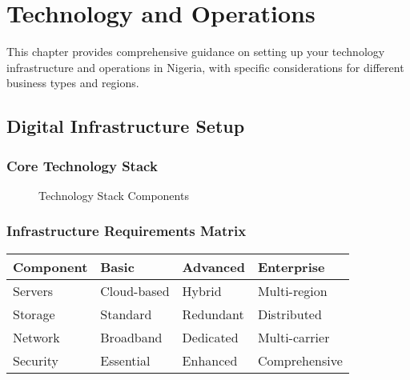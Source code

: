 
\chapter{Technology and Operations}

\begin{importantbox}
This chapter provides comprehensive guidance on setting up your technology infrastructure and operations in Nigeria, with specific considerations for different business types and regions.
\end{importantbox}

\FloatBarrier
\section{Digital Infrastructure Setup}

\subsection{Core Technology Stack}
\begin{figure}[htbp]
    \centering
    \caption{Technology Stack Components}
    \label{fig:tech-stack}
\end{figure}

\subsection{Infrastructure Requirements Matrix}
\begin{center}
\begin{tabularx}{\textwidth}{>{\raggedright\arraybackslash}X >{\raggedright\arraybackslash}X >{\raggedright\arraybackslash}X >{\raggedright\arraybackslash}X}
    \toprule
    \textbf{Component} & \textbf{Basic} & \textbf{Advanced} & \textbf{Enterprise} \\
    \midrule
    Servers & Cloud-based & Hybrid & Multi-region \\
    Storage & Standard & Redundant & Distributed \\
    Network & Broadband & Dedicated & Multi-carrier \\
    Security & Essential & Enhanced & Comprehensive \\
    \bottomrule
\end{tabularx}
\end{center}

